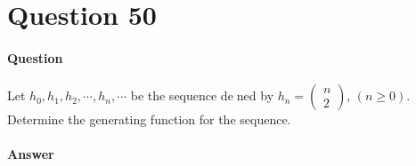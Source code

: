 \documentclass[UTF8]{article}
\begin{document}
\section{Question 50}
\paragraph{Question}
Let $ h_{0}, h_{1}, h_{2}, \cdots ,h_{n}, \cdots $ be the sequence dened by $ h_{n} = \begin{pmatrix} n \\ 2 \end{pmatrix} $, $ (n \geq 0) $. Determine the generating function for the sequence.
\paragraph{Answer}
\begin{center}

\end{center}
\end{document}
